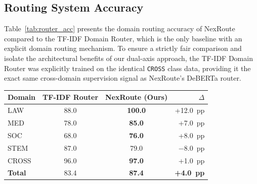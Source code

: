 \documentclass[a4paper,fleql,doubleblind]{cas-sc}
\begin{document}
\subsection{Routing System Accuracy}
\label{ssec:router}
Table~\ref{tab:router_acc} presents the domain routing accuracy of NexRoute
compared to the TF-IDF Domain Router, which is the only baseline with an explicit domain routing mechanism.
To ensure a strictly fair comparison and isolate the architectural
benefits of our dual-axis approach, the TF-IDF Domain Router was explicitly
trained on the identical \texttt{CROSS} class data, providing it the exact
same cross-domain supervision signal as NexRoute's DeBERTa router.

\vspace{6pt plus 4pt minus 3pt}
\begin{center}
\begingroup
{}
\label{tab:router_acc}
\begin{tabular}{lccr}
\toprule
\textbf{Domain} & \textbf{TF-IDF Router} & \textbf{NexRoute (Ours)} & \textbf{$\Delta$} \\
\midrule
LAW              & 88.0 & \textbf{100.0} & +12.0~pp \\
MED              & 78.0 & \textbf{85.0}  & +7.0~pp \\
SOC              & 68.0 & \textbf{76.0}  & +8.0~pp \\
STEM             & 87.0 & 79.0           & $-$8.0~pp \\
\midrule
CROSS            & 96.0 & \textbf{97.0}  & +1.0~pp \\
\midrule
\textbf{Total}   & 83.4 & \textbf{87.4}  & \textbf{+4.0~pp} \\
\bottomrule
\end{tabular}
\endgroup
\end{center}
\vspace{6pt plus 4pt minus 3pt}
\end{document}
